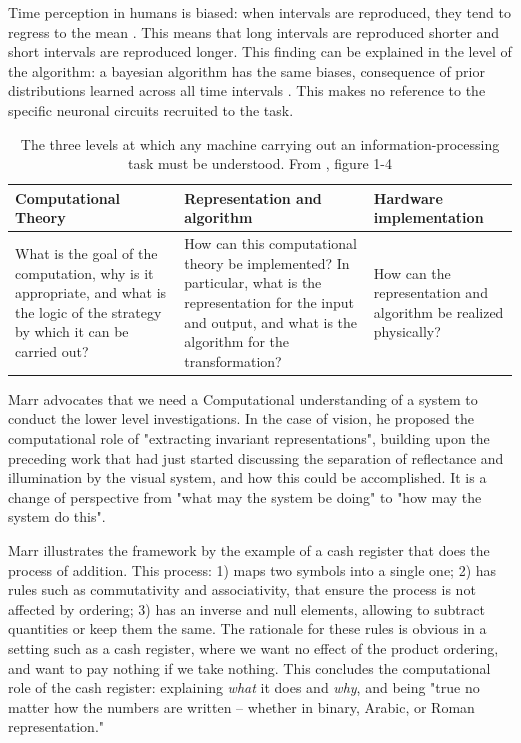     Time perception in humans is biased: when intervals are reproduced, they tend to regress to the mean \cite{jazayeri2010temporal}. This means that long intervals are reproduced shorter and short intervals are reproduced longer. This finding can be explained in the level of the algorithm: a bayesian algorithm has the same biases, consequence of prior distributions learned across all time intervals \cite{jazayeri2010temporal}. This makes no reference to the specific neuronal circuits recruited to the task. 

    \begin{table}[]
        \centering
        \begin{tabular}{p{4cm}p{4cm}p{4cm}}
        \hline \vspace{.2cm}
            Computational Theory & Representation and algorithm & Hardware implementation\\\hline
            
            What is the goal of the computation, why is it appropriate, and what is the logic of the strategy by which it can be carried out? & 
            
            How can this computational theory be implemented? In particular, what is the representation for the input and output, and what is the algorithm for the transformation? &
            
            How can the representation and algorithm be realized physically?
            \\\hline
        \end{tabular}
        \caption{The three levels at which any machine carrying out an information-processing task must be understood. From \cite{marr1982vision}, figure 1-4}
        \label{tab:three_levels}
    \end{table}
    
    Marr advocates that we need a Computational understanding of a system to conduct the lower level investigations. In the case of vision, he proposed the computational role of "extracting invariant representations", building upon the preceding work that had just started discussing the separation of reflectance and illumination by the visual system, and how this could be accomplished. It is a change of perspective from "what may the system be doing" to "how may the system do this".
    
   
    
        Marr illustrates the framework by the example of a cash register that does the process of addition. This process: 1) maps two symbols into a single one; 2) has rules such as commutativity and associativity, that ensure the process is not affected by ordering; 3) has an inverse and null elements, allowing to subtract quantities or keep them the same. The rationale for these rules is obvious in a setting such as a cash register, where we want no effect of the product ordering, and want to pay nothing if we take nothing. This concludes the computational role of the cash register: explaining \textit{what} it does and \textit{why}, and being "true no matter how the numbers are written -- whether in binary, Arabic, or Roman representation."
        
